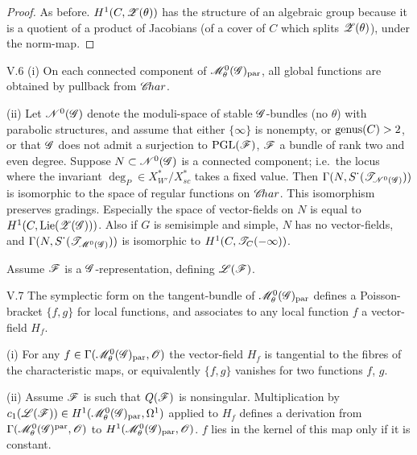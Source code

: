 \documentclass[12pt,english]{smfart}
\theoremstyle{plain} \newtheorem{innerthm}{Theorem} \newtheorem{innerlem}{Lemma} \newtheorem{innerprop}{Proposition} \newtheorem{innercor}{Corollary} \theoremstyle{definition} \newtheorem{innerdefn}{Definition} \newtheorem{innerconstr}{Construction} \theoremstyle{remark} \newtheorem*{remark}{Remark} \newtheorem*{remarks}{Remarks} \newtheorem*{applications}{Applications}
\begin{document}
\begin{proof}
As before. $H^{1}(C,\mathscr{Z}(\theta))$ has the structure of an algebraic group because it is a quotient of a product of Jacobians (of a cover of $C$ which splits $\mathscr{Z}(\theta)$), under the norm-map.
\end{proof}

\begin{corollary}{V.6}\label{cor:V.6}
(i) On each connected component of $\mathscr{M}^{0}_{\theta}(\mathscr{G})_{\mathrm{par}}$, all global functions are obtained by pullback from $\mathscr{C}\!har$.

(ii) Let $\mathscr{N}^{0}(\mathscr{G})$ denote the moduli-space of stable $\mathscr{G}$-bundles (no $\theta$) with parabolic structures, and assume that either $\{\infty\}$ is nonempty, or $\operatorname{genus}(C)>2$, or that $\mathscr{G}$ does not admit a surjection to $\operatorname{PGL}(\mathscr{F})$, $\mathscr{F}$ a bundle of rank two and even degree. Suppose $N\subset\mathscr{N}^{0}(\mathscr{G})$ is a connected component; i.e.\ the locus where the invariant $\deg_{P}\in X^{*}_{W'}/X^{*}_{sc}$ takes a fixed value. Then $\Gamma(N,S^{\textstyle\cdot}(\mathscr{T}_{\mathscr{N}^{0}(\mathscr{G})}))$ is isomorphic to the space of regular functions on $\mathscr{C}\!har$. This isomorphism preserves gradings. Especially the space of vector-fields on $N$ is equal to $H^{1}(C,\operatorname{Lie}(\mathscr{Z}(\mathscr{G})))$. Also if $G$ is semisimple and simple, $N$ has no vector-fields, and $\Gamma(N,S^{\textstyle\cdot}(\mathscr{T}_{\mathscr{M}^{0}(\mathscr{G})}))$ is isomorphic to $H^{1}(C,\mathscr{T}_{C}(-\infty))$.
\end{corollary}

Assume $\mathscr{F}$ is a $\mathscr{G}$-representation, defining $\mathscr{L}(\mathscr{F})$.

\begin{corollary}{V.7}\label{cor:V.7}
The symplectic form on the tangent-bundle of $\mathscr{M}^{0}_{\theta}(\mathscr{G})_{\mathrm{par}}$ defines a Poisson-bracket $\{f,g\}$ for local functions, and associates to any local function $f$ a vector-field $H_{f}$.

(i) For any $f\in\Gamma(\mathscr{M}^{0}_{\theta}(\mathscr{G})_{\mathrm{par}},\mathscr{O})$ the vector-field $H_{f}$ is tangential to the fibres of the characteristic maps, or equivalently $\{f,g\}$ vanishes for two functions $f$, $g$.

(ii) Assume $\mathscr{F}$ is such that $Q(\mathscr{F})$ is nonsingular. Multiplication by
$c_{1}(\mathscr{L}(\mathscr{F}))\in H^{1}(\mathscr{M}^{0}_{\theta}(\mathscr{G})_{\mathrm{par}},\Omega^{1})$ applied to $H_{f}$ defines a derivation from $\Gamma(\mathscr{M}^{0}_{\theta}(\mathscr{G})^{\mathrm{par}},\mathscr{O})$ to $H^{1}(\mathscr{M}^{0}_{\theta}(\mathscr{G})_{\mathrm{par}},\mathscr{O})$. $f$ lies in the kernel of this map only if it is constant.
\end{corollary}
\end{document}
